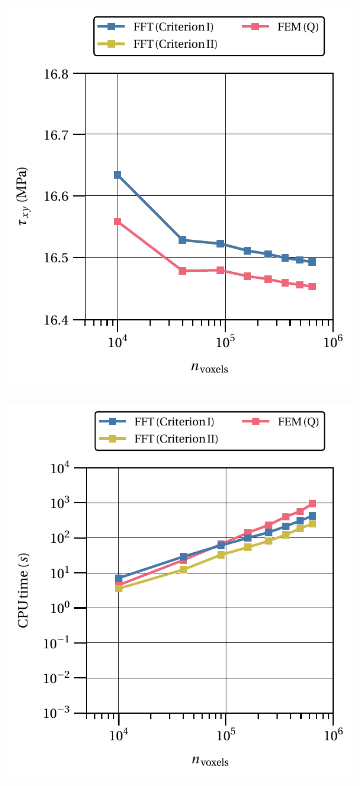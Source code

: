 \begin{figure}[hbt]
\centering
	\begin{subfigure}[b]{0.49\textwidth}
    \centering
    \includegraphics[width=\textwidth]{figures/hencky_2D_shear_homo_stress_12_vs_n_voxels}
    \caption{}
    \label{subfig:hencky_2D_shear_homo_stress_12_vs_n_voxels}
  \end{subfigure}
  \begin{subfigure}[b]{0.49\textwidth}
    \centering
    \includegraphics[width=\textwidth]{figures/hencky_2D_shear_cpu_time_vs_n_voxels}

\end{subfigure}
\end{figure}
